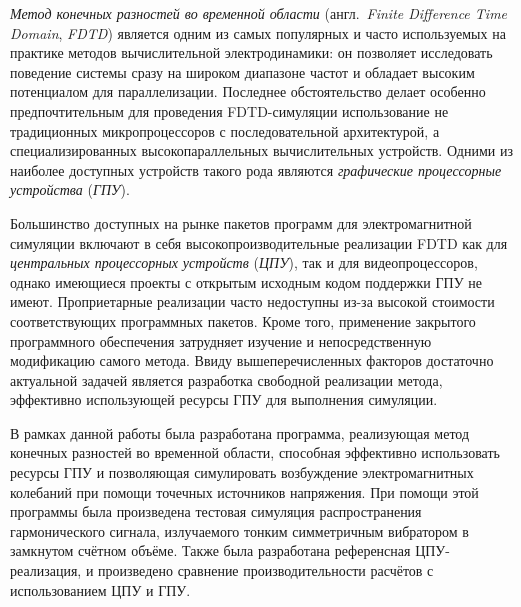 
\textit{Метод конечных разностей во временной области} (англ.~\textit{Finite Difference Time Domain}, \textit{FDTD}) является одним из самых популярных и часто используемых на практике методов вычислительной электродинамики: он позволяет исследовать поведение системы сразу на широком диапазоне частот и обладает высоким потенциалом для параллелизации. Последнее обстоятельство делает особенно предпочтительным для проведения FDTD-симуляции использование не традиционных микропроцессоров с последовательной архитектурой, а специализированных высокопараллельных вычислительных устройств. Одними из наиболее доступных устройств такого рода являются \textit{графические процессорные устройства} (\textit{ГПУ}).

Большинство доступных на рынке пакетов программ для электромагнитной симуляции включают в себя высокопроизводительные реализации FDTD как для \textit{центральных процессорных устройств} (\textit{ЦПУ}), так и для видеопроцессоров, однако имеющиеся проекты с открытым исходным кодом поддержки ГПУ не имеют. Проприетарные реализации часто недоступны из-за высокой стоимости соответствующих программных пакетов. Кроме того, применение закрытого программного обеспечения затрудняет изучение и непосредственную модификацию самого метода. Ввиду вышеперечисленных факторов достаточно актуальной задачей является разработка свободной реализации метода, эффективно использующей ресурсы ГПУ для выполнения симуляции.

В рамках данной работы была разработана программа, реализующая метод конечных разностей во временной области, способная эффективно использовать ресурсы ГПУ и позволяющая симулировать возбуждение электромагнитных колебаний при помощи точечных источников напряжения. При помощи этой программы была произведена тестовая симуляция распространения гармонического сигнала, излучаемого тонким симметричным вибратором в замкнутом счётном объёме. Также была разработана референсная ЦПУ-реализация, и произведено сравнение производительности расчётов с использованием ЦПУ и ГПУ.

\clearpage